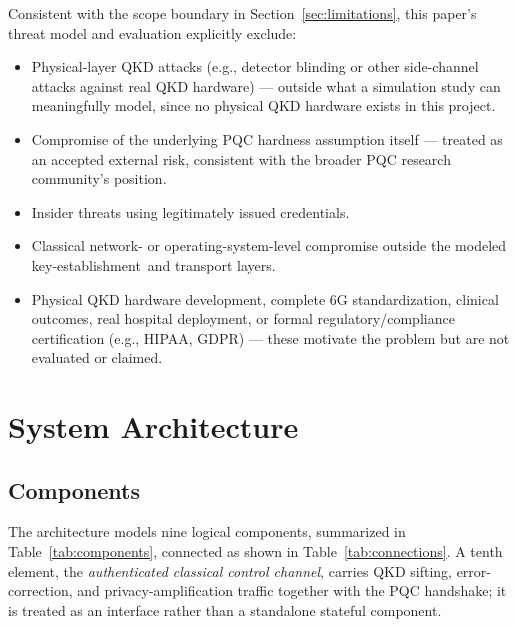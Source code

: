 \documentclass[journal]{IEEEtran}
\newcommand{\keyest}{key-establishment}
\begin{document}
Consistent with the scope boundary in Section~\ref{sec:limitations}, this paper's threat model and evaluation explicitly exclude:

\begin{itemize}
\item Physical-layer QKD attacks (e.g., detector blinding or other side-channel attacks against real QKD hardware) --- outside what a simulation study can meaningfully model, since no physical QKD hardware exists in this project.
\item Compromise of the underlying PQC hardness assumption itself --- treated as an accepted external risk, consistent with the broader PQC research community's position.
\item Insider threats using legitimately issued credentials.
\item Classical network- or operating-system-level compromise outside the modeled \keyest\ and transport layers.
\item Physical QKD hardware development, complete 6G standardization, clinical outcomes, real hospital deployment, or formal regulatory/compliance certification (e.g., HIPAA, GDPR) --- these motivate the problem but are not evaluated or claimed.
\end{itemize}

\section{System Architecture}
\label{sec:architecture}

\subsection{Components}

The architecture models nine logical components, summarized in Table~\ref{tab:components}, connected as shown in Table~\ref{tab:connections}. A tenth element, the \emph{authenticated classical control channel}, carries QKD sifting, error-correction, and privacy-amplification traffic together with the PQC handshake; it is treated as an interface rather than a standalone stateful component.
\end{document}
